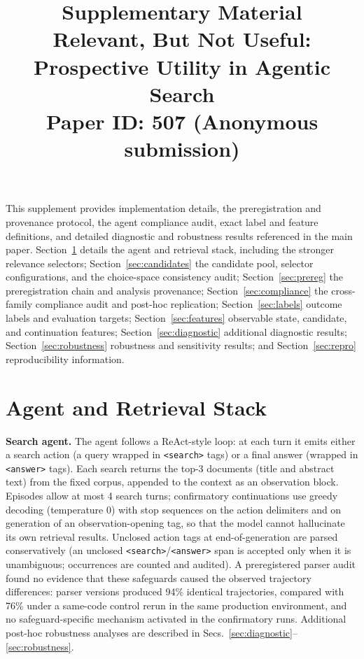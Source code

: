 \documentclass[10pt]{article}
\title{Supplementary Material\\[0.3em]
\large Relevant, But Not Useful: Prospective Utility in Agentic Search\\
\normalsize Paper ID: 507 (Anonymous submission)}
\date{}
\newcommand{\stitle}[1]{\vspace{0.4em}\noindent\textbf{#1}\hspace{0.6em}}
\begin{document}
\maketitle
\vspace{-2.5em}

\noindent This supplement provides implementation details, the preregistration
and provenance protocol, the agent compliance audit, exact label and feature
definitions, and detailed diagnostic and robustness results referenced in the
main paper.
Section~\ref{sec:agent} details the agent and retrieval stack, including the
stronger relevance selectors;
Section~\ref{sec:candidates} the candidate pool, selector configurations, and
the choice-space consistency audit;
Section~\ref{sec:prereg} the preregistration chain and analysis provenance;
Section~\ref{sec:compliance} the cross-family compliance audit and post-hoc
replication;
Section~\ref{sec:labels} outcome labels and evaluation targets;
Section~\ref{sec:features} observable state, candidate, and continuation
features;
Section~\ref{sec:diagnostic} additional diagnostic results;
Section~\ref{sec:robustness} robustness and sensitivity results; and
Section~\ref{sec:repro} reproducibility information.

\section{Agent and Retrieval Stack}
\label{sec:agent}

\stitle{Search agent.}
The agent follows a ReAct-style loop: at each turn it emits either a search
action (a query wrapped in \texttt{<search>} tags) or a final answer
(wrapped in \texttt{<answer>} tags).
Each search returns the top-3 documents (title and abstract text) from the
fixed corpus, appended to the context as an observation block.
Episodes allow at most 4 search turns; confirmatory continuations use greedy
decoding (temperature $0$) with stop sequences on the action delimiters and on
generation of an observation-opening tag, so that the model cannot hallucinate
its own retrieval results.
Unclosed action tags at end-of-generation are parsed conservatively
(an unclosed \texttt{<search>}/\texttt{<answer>} span is accepted only when it
is unambiguous; occurrences are counted and audited).
A preregistered parser audit found no evidence that these safeguards caused
the observed trajectory differences: parser versions produced 94\% identical
trajectories, compared with 76\% under a same-code control rerun in the same
production environment, and no safeguard-specific mechanism activated in the
confirmatory runs. Additional post-hoc robustness analyses are described in
Secs.~\ref{sec:diagnostic}--\ref{sec:robustness}.
\end{document}
